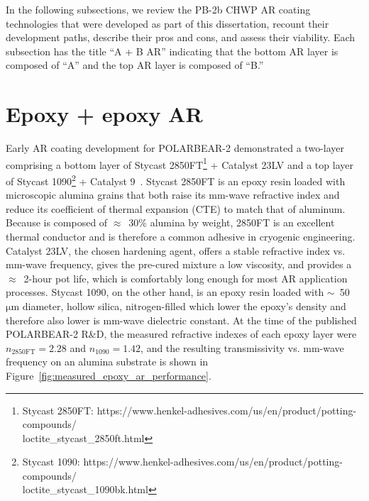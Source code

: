 In the following subsections, we review the PB-2b CHWP AR coating technologies that were developed as part of this dissertation, recount their development paths, describe their pros and cons, and assess their viability. Each subsection has the title ``A + B AR'' indicating that the bottom AR layer is composed of ``A'' and the top AR layer is composed of ``B.''



\section{Epoxy + epoxy AR}
\label{sec:sapphire_ar_coating_epoxy}

Early AR coating development for POLARBEAR-2 demonstrated a two-layer  comprising a bottom layer of Stycast 2850FT\footnote{Stycast 2850FT: https://www.henkel-adhesives.com/us/en/product/potting-compounds/ \\ loctite\_stycast\_2850ft.html} + Catalyst 23LV and a top layer of Stycast 1090\footnote{Stycast 1090: https://www.henkel-adhesives.com/us/en/product/potting-compounds/ \\ loctite\_stycast\_1090bk.html} + Catalyst 9~\cite{rosen_epoxy-based_2013}. Stycast 2850FT is an epoxy resin loaded with microscopic alumina grains that both raise its mm-wave refractive index and reduce its coefficient of thermal expansion (CTE) to match that of aluminum. Because is composed of $\approx$~30\% alumina by weight, 2850FT is an excellent thermal conductor and is therefore a common adhesive in cryogenic engineering. Catalyst 23LV, the chosen hardening agent, offers a stable refractive index vs. mm-wave frequency, gives the pre-cured mixture a low viscosity, and provides a $\approx$~2-hour pot life, which is comfortably long enough for most AR application processes. Stycast 1090, on the other hand, is an epoxy resin loaded with $\sim$~50~$\mathrm{\mu m}$ diameter, hollow silica, nitrogen-filled  which lower the epoxy's density and therefore also lower is mm-wave dielectric constant. At the time of the published POLARBEAR-2 R\&D, the measured refractive indexes of each epoxy layer were $n_{\mathrm{2850FT}} = 2.28$ and $n_{\mathrm{1090}} = 1.42$, and the resulting transmissivity vs. mm-wave frequency on an alumina substrate is shown in Figure~\ref{fig:measured_epoxy_ar_performance}.

